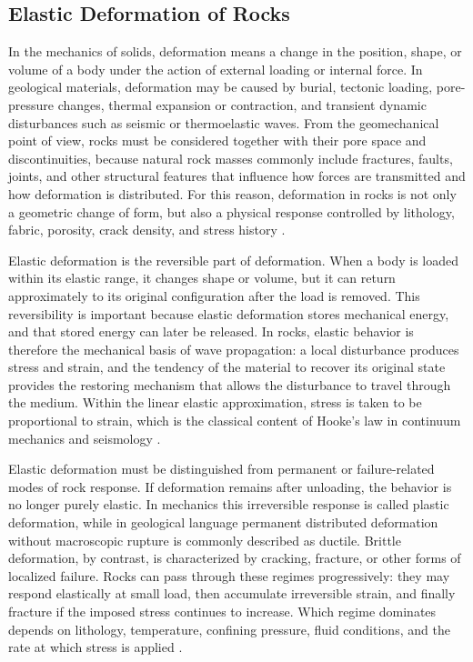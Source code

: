 \subsection{Elastic Deformation of Rocks}

In the mechanics of solids, deformation means a change in the position, shape, or volume of a body under the action of external loading or internal force. In geological materials, deformation may be caused by burial, tectonic loading, pore-pressure changes, thermal expansion or contraction, and transient dynamic disturbances such as seismic or thermoelastic waves. From the geomechanical point of view, rocks must be considered together with their pore space and discontinuities, because natural rock masses commonly include fractures, faults, joints, and other structural features that influence how forces are transmitted and how deformation is distributed. For this reason, deformation in rocks is not only a geometric change of form, but also a physical response controlled by lithology, fabric, porosity, crack density, and stress history \cite{jaeger2007,cornet2007}.

Elastic deformation is the reversible part of deformation. When a body is loaded within its elastic range, it changes shape or volume, but it can return approximately to its original configuration after the load is removed. This reversibility is important because elastic deformation stores mechanical energy, and that stored energy can later be released. In rocks, elastic behavior is therefore the mechanical basis of wave propagation: a local disturbance produces stress and strain, and the tendency of the material to recover its original state provides the restoring mechanism that allows the disturbance to travel through the medium. Within the linear elastic approximation, stress is taken to be proportional to strain, which is the classical content of Hooke's law in continuum mechanics and seismology \cite{aki2002,jaeger2007}.

Elastic deformation must be distinguished from permanent or failure-related modes of rock response. If deformation remains after unloading, the behavior is no longer purely elastic. In mechanics this irreversible response is called plastic deformation, while in geological language permanent distributed deformation without macroscopic rupture is commonly described as ductile. Brittle deformation, by contrast, is characterized by cracking, fracture, or other forms of localized failure. Rocks can pass through these regimes progressively: they may respond elastically at small load, then accumulate irreversible strain, and finally fracture if the imposed stress continues to increase. Which regime dominates depends on lithology, temperature, confining pressure, fluid conditions, and the rate at which stress is applied \cite{jaeger2007,cornet2007}.

